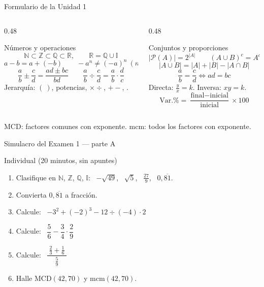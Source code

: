 \documentclass[aspectratio=169,10pt]{beamer}
\begin{document}
\begin{frame}{Formulario de la Unidad 1}
  \tiny
  \begin{columns}[T,onlytextwidth]
    \begin{column}{0.48\textwidth}
      \begin{block}{Números y operaciones}
        \tiny
        \[ \mathbb{N}\subset\mathbb{Z}\subset\mathbb{Q}\subset\mathbb{R},
           \qquad \mathbb{R}=\mathbb{Q}\cup\mathbb{I} \]
        \[ a-b = a+(-b) \qquad -a^{n} \neq (-a)^{n} \ (n \text{ par}) \]
        \[ \frac{a}{b}\pm\frac{c}{d} = \frac{ad\pm bc}{bd} \qquad
           \frac{a}{b}\div\frac{c}{d} = \frac{a}{b}\cdot\frac{d}{c} \]
        Jerarquía: $(\ )$, potencias, $\times\div$, $+-$, .
      \end{block}
    \end{column}
    \begin{column}{0.48\textwidth}
      \begin{block}{Conjuntos y proporciones}
        \tiny
        \[ |\mathcal{P}(A)| = 2^{|A|} \qquad
           (A\cup B)^{c} = A^{c}\cap B^{c} \]
        \[ |A\cup B| = |A|+|B|-|A\cap B| \]
        \[ \frac{a}{b}=\frac{c}{d} \Leftrightarrow ad = bc \]
        Directa: $\tfrac{y}{x}=k$. \quad Inversa: $xy=k$.
        \[ \text{Var.\%} = \frac{\text{final}-\text{inicial}}{\text{inicial}}
           \times 100 \]
      \end{block}
    \end{column}
  \end{columns}

  \vspace{0.05cm}
  {\tiny\color{uniGris} MCD: factores comunes con  exponente. \quad
  mcm: todos los factores con  exponente.}
\end{frame}

\begin{frame}{Simulacro del Examen 1 — parte A}
  \begin{alertblock}{Individual (20 minutos, sin apuntes)}
    \scriptsize
    \begin{enumerate}\setlength{\itemsep}{0.02cm}
      \item Clasifique en $\mathbb{N}$, $\mathbb{Z}$, $\mathbb{Q}$,
            $\mathbb{I}$: \ $-\sqrt{49}$, \ $\sqrt{5}$, \ $\tfrac{27}{9}$,
            \ $0{,}\overline{81}$.
      \item Convierta $0{,}\overline{81}$ a fracción.
      \item Calcule: \ $-3^{2} + (-2)^{3} - 12\div(-4)\cdot 2$
      \item Calcule: \ $\dfrac{5}{6} - \dfrac{3}{4} \cdot \dfrac{2}{9}$
      \item Calcule: \ $\dfrac{\ \frac{2}{3}+\frac{1}{6}\ }
            {\ \frac{5}{9}\ }$
      \item Halle $\mathrm{MCD}(42,70)$ y $\mathrm{mcm}(42,70)$.
    \end{enumerate}
  \end{alertblock}
\end{frame}
\end{document}
